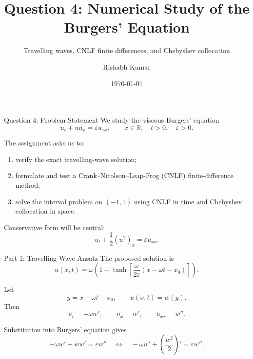 \documentclass[aspectratio=169,11pt]{beamer}
\title[Viscous Burgers' Equation]{Question 4: Numerical Study of the Burgers' Equation}
\subtitle{Travelling waves, CNLF finite differences, and Chebyshev collocation}
\author{Rishabh Kumar}
\institute{MH7007 Topics in Scientific Computation I}
\date{\today}
\begin{document}
\begin{frame}
    \titlepage
\end{frame}

\begin{frame}{Question 4: Problem Statement}
    We study the viscous Burgers' equation
    \begin{equation}
        u_t+u u_x=\varepsilon u_{xx},
        \qquad x\in\mathbb{R},\quad t>0,\quad \varepsilon>0.
    \end{equation}

    The assignment asks us to:
    \begin{enumerate}
        \item verify the exact travelling-wave solution;
        \item formulate and test a Crank--Nicolson--Leap-Frog (CNLF) finite-difference method;
        \item solve the interval problem on $(-1,1)$ using CNLF in time and Chebyshev collocation in space.
    \end{enumerate}

    \vspace{0.3cm}
    Conservative form will be central:
    \begin{equation}
        u_t+\frac12(u^2)_x=\varepsilon u_{xx}.
    \end{equation}
\end{frame}

\begin{frame}{Part 1: Travelling-Wave Ansatz}
    The proposed solution is
    \begin{equation}
        u(x,t)=\omega\left(1-\tanh\left[
        \frac{\omega}{2\varepsilon}(x-\omega t-x_0)
        \right]\right).
    \end{equation}

    Let
    \begin{equation}
        y=x-\omega t-x_0,
        \qquad u(x,t)=w(y).
    \end{equation}
    Then
    \begin{equation}
        u_t=-\omega w',
        \qquad u_x=w',
        \qquad u_{xx}=w''.
    \end{equation}

    Substitution into Burgers' equation gives
    \begin{equation}
        -\omega w'+w w'=\varepsilon w''
        \quad\Longleftrightarrow\quad
        -\omega w'+\left(\frac{w^2}{2}\right)'=\varepsilon w''.
    \end{equation}
\end{frame}
\end{document}
